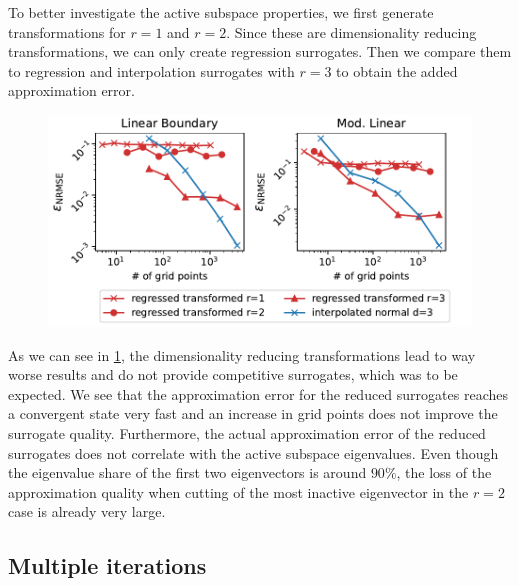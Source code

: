 \documentclass[
  a4paper,  %
  twoside,  %
  bibliography=totoc,
  headsepline,
  cleardoublepage=empty,
  parskip=half,
  draft=false
]{scrbook}
\begin{document}
To better investigate the active subspace properties, we first generate transformations for $r=1$ and $r=2$.
Since these are dimensionality reducing transformations, we can only create regression surrogates.
Then we compare them to regression and interpolation surrogates with $r=3$ to obtain the added approximation error.

\newpage
\begin{mdframed}[style=style]
\begin{figure}[H]
\includegraphics[width=\textwidth]{graphics/ishigami_red}\vspace{-2mm}
\delimit
{}
\label{fig:ishigami_red}
\end{figure}
\end{mdframed}
%
As we can see in \cref{fig:ishigami_red}, the dimensionality reducing transformations lead to way worse results and do not provide competitive surrogates, which was to be expected.
We see that the approximation error for the reduced surrogates reaches a convergent state very fast and an increase in grid points does not improve the surrogate quality.
Furthermore, the actual approximation error of the reduced surrogates does not correlate with the active subspace eigenvalues.
Even though the eigenvalue share of the first two eigenvectors is around $90\%$, the loss of the approximation quality when cutting of the most inactive eigenvector in the $r=2$ case is already very large.

\subsection{Multiple iterations}
\end{document}
